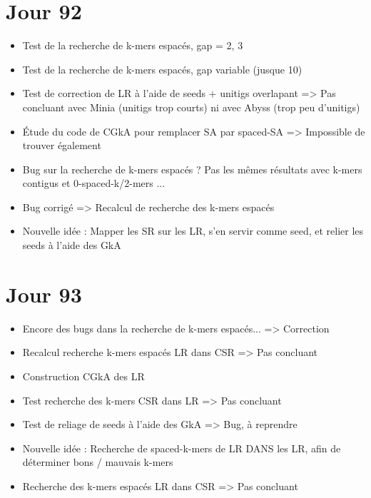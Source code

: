 \documentclass[12pt]{report}
\begin{document}
\section{Jour 92}

\begin{itemize}
	\item Test de la recherche de k-mers espacés, gap = 2, 3
	
	\item Test de la recherche de k-mers espacés, gap variable (jusque 10)
	
	\item Test de correction de LR à l'aide de seeds + unitigs overlapant => Pas concluant avec Minia (unitigs trop courts) 
		  ni avec Abyss (trop peu d'unitigs)
	
	\item Étude du code de CGkA pour remplacer SA par spaced-SA => Impossible de trouver également
	
	\item Bug sur la recherche de k-mers espacés ? Pas les mêmes résultats avec k-mers contigus et 0-spaced-k/2-mers ...
	
	\item Bug corrigé => Recalcul de recherche des k-mers espacés
	
	\item Nouvelle idée : Mapper les SR sur les LR, s'en servir comme seed, et relier les seeds à l'aide des GkA
\end{itemize}

\section{Jour 93}

\begin{itemize}
	\item Encore des bugs dans la recherche de k-mers espacés... => Correction
	
	\item Recalcul recherche k-mers espacés LR dans CSR => Pas concluant
	
	\item Construction CGkA des LR
	
	\item Test recherche des k-mers CSR dans LR => Pas concluant

	\item Test de reliage de seeds à l'aide des GkA => Bug, à reprendre
	
	\item Nouvelle idée : Recherche de spaced-k-mers de LR DANS les LR, afin de déterminer bons / mauvais k-mers
	
	\item Recherche des k-mers espacés LR dans CSR => Pas concluant
\end{itemize}
\end{document}
